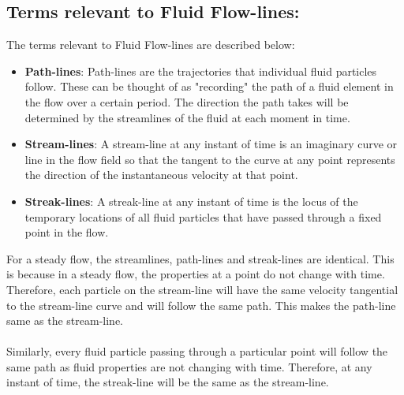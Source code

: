 \documentclass[12pt,a4paper]{article}
\begin{document}
\subsection{Terms relevant to Fluid Flow-lines:}
The terms relevant to Fluid Flow-lines are described below:
\begin{itemize}
\item \textbf{Path-lines}: Path-lines are the trajectories that individual fluid particles follow. These can be thought of as "recording" the path of a fluid element in the flow over a certain period. The direction the path takes will be determined by the streamlines of the fluid at each moment in time.
\item \textbf{Stream-lines}: A stream-line at any instant of time is an imaginary curve or line in the flow field so that the tangent to the curve at any point represents the direction of the instantaneous velocity at that point.
\item \textbf{Streak-lines}: A streak-line at any instant of time is the locus of the temporary locations of all fluid particles that have passed through a fixed point in the flow.
\end{itemize}
For a steady flow, the streamlines, path-lines and streak-lines are identical.
This is because in a steady flow, the properties at a point do not change with time.
Therefore, each particle on the stream-line will have the same velocity tangential to the stream-line curve and will follow the same path. This makes the path-line same as the stream-line.\\
\\Similarly, every fluid particle passing through a particular point will follow the same path as fluid properties are not changing with time. Therefore, at any instant of time, the streak-line will be the same as the stream-line.
\end{document}
